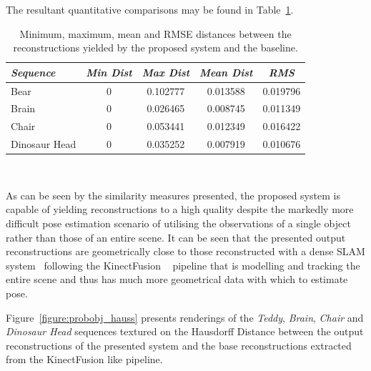 The resultant quantitative comparisons may be found in Table~\ref{table:probobj_hauss}.
\begin{table}[!htbp]
  \centering
  \begin{tabular}{lcccc}
    \emph{Sequence} & \emph{Min Dist} & \emph{Max Dist} & \emph{Mean Dist} & \emph{RMS}\\
    \midrule
    \textsf{Bear} & 0 & 0.102777 & 0.013588 & 0.019796 \\
    \textsf{Brain} & 0 & 0.026465 & 0.008745 & 0.011349 \\
    \textsf{Chair} & 0 & 0.053441 & 0.012349 & 0.016422 \\
    \textsf{Dinosaur Head} & 0 & 0.035252 & 0.007919 & 0.010676
  \end{tabular}
  \caption[Probabilistic Object Reconstruction Hausdorff Distance]
  {Minimum, maximum, mean and RMSE distances between the reconstructions yielded by 
  the proposed system and the baseline.}
~\label{table:probobj_hauss}
\end{table}

As can be seen by the similarity measures presented, the proposed system is capable of 
yielding reconstructions to a high quality despite the markedly more difficult pose estimation 
scenario of utilising the observations of a single object rather than those of an entire scene. 
It can be seen that the presented output reconstructions are geometrically close to those 
reconstructed with a dense SLAM system~\cite{Prisacariu2014} following the KinectFusion 
~\cite{Newcombe2011} pipeline that is modelling and tracking the entire scene and thus has 
much more geometrical data with which to estimate pose.

Figure~\ref{figure:probobj_hauss} presents renderings of the \textit{Teddy}, 
\textit{Brain}, \textit{Chair} and \textit{Dinosaur Head} sequences textured 
on the Hausdorff Distance between the output reconstructions of the presented 
system and the base reconstructions extracted from the KinectFusion like pipeline.

